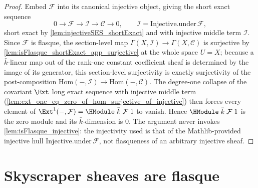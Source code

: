 \begin{proof}\leanok
  Embed \(\mathcal F\) into its canonical injective object, giving the
  short exact sequence
  \[
    0 \to \mathcal F \to \mathcal I \to \mathcal C \to 0,
    \qquad \mathcal I = \mathrm{Injective.under}\,\mathcal F,
  \]
  short exact by \cref{lem:injectiveSES_shortExact} and with injective
  middle term \(\mathcal I\). Since \(\mathcal F\) is flasque, the
  section-level map \(\Gamma(X, \mathcal I) \to \Gamma(X, \mathcal C)\) is
  surjective by \cref{lem:isFlasque_shortExact_app_surjective} at the
  whole space \(U = X\); because a \(\bar k\)-linear map out of the
  rank-one constant coefficient sheaf is determined by the image of its
  generator, this section-level surjectivity is exactly surjectivity of
  the post-composition
  \(\mathrm{Hom}(-, \mathcal I) \to \mathrm{Hom}(-, \mathcal C)\). The
  degree-one collapse of the covariant \(\Ext\) long exact sequence with
  injective middle term
  (\cref{lem:ext_one_eq_zero_of_hom_surjective_of_injective}) then forces
  every element of
  \(\Ext^1(-, \mathcal F) = \HModule\;\bar k\;\mathcal F\;1\) to vanish.
  Hence \(\HModule\;\bar k\;\mathcal F\;1\) is the zero module and its
  \(\bar k\)-dimension is \(0\). The argument never invokes
  \cref{lem:isFlasque_injective}: the injectivity used is that of the
  Mathlib-provided injective hull \(\mathrm{Injective.under}\,\mathcal F\),
  not flasqueness of an arbitrary injective sheaf.
\end{proof}

\section{Skyscraper sheaves are flasque}
\label{sec:H1Vanishing_skyscraperFlasque}


